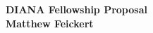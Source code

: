 \documentclass[12pt,letterpaper]{article}
\begin{document}
\begin{centering}
	{\Huge
		\textbf{DIANA Fellowship Proposal}\\
	}
	{\LARGE
		\textbf{Matthew Feickert}\\
	}
\end{centering}\vspace{10pt}



\clearpage
\flushbottom
%


\end{document}
